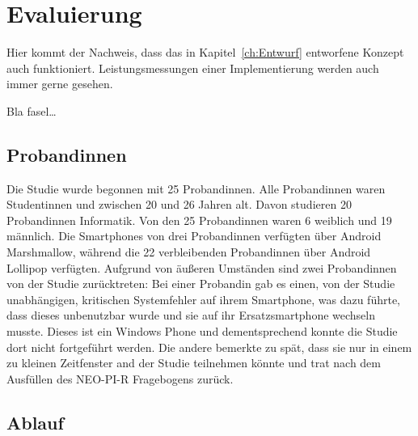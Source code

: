 
\chapter{Evaluierung}
\label{ch:Evaluierung}
Hier kommt der Nachweis, dass das in Kapitel~\ref{ch:Entwurf}
entworfene Konzept auch funktioniert. Leistungsmessungen einer
Implementierung werden auch immer gerne gesehen.

Bla fasel\ldots

\section{Probandinnen}
\label{ch:Evaluierung:sec:Abschnitt1}

Die Studie wurde begonnen mit 25 Probandinnen.
Alle Probandinnen waren Studentinnen und zwischen 20 und 26 Jahren alt.
Davon studieren 20 Probandinnen Informatik. 
Von den 25 Probandinnen waren 6 weiblich und 19 männlich.
Die Smartphones von drei Probandinnen verfügten über Android Marshmallow, während die 22 verbleibenden Probandinnen über Android Lollipop verfügten.  
Aufgrund von äußeren Umständen sind zwei Probandinnen von der Studie zurücktreten:
Bei einer Probandin gab es einen, von der Studie unabhängigen, kritischen Systemfehler auf ihrem Smartphone, was dazu führte, dass dieses unbenutzbar wurde und sie auf ihr Ersatzsmartphone wechseln musste.
Dieses ist ein Windows Phone und dementsprechend konnte die Studie dort nicht fortgeführt werden.
Die andere bemerkte zu spät, dass sie nur in einem zu kleinen Zeitfenster and der Studie teilnehmen könnte und trat nach dem Ausfüllen des NEO-PI-R Fragebogens zurück.


\section{Ablauf}
\label{ch:Entwurf:sec:Abschnitt2}

